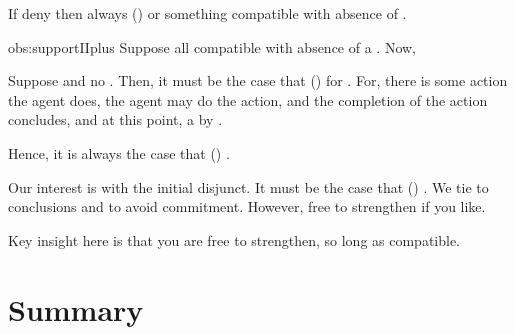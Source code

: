 \begin{note}
  \begin{observation}%
    \label{obs:supportIIplus}%
    If deny \supportII{} then always (\pwP{}) \wit{} or something compatible with absence of \wit{}.
  \end{observation}

  \begin{argument}{obs:supportIIplus}
    Suppose all compatible with absence of a \wit{}.
    Now,

    Suppose \fc{} and no \ros{}.
    Then, it must be the case that (\pwP{}) \wit{} for \ros{}.
    For, there is some action the agent does, the agent may do the action, and the completion of the action concludes, and at this point, a \ros{} by \supportII{}.

    Hence, it is always the case that (\pwP{}) \wit{}.
  \end{argument}

  Our interest is with the initial disjunct.
  It must be the case that (\pwP{}) \wit{}.
  We tie  to conclusions and to avoid commitment.
  However, free to strengthen if you like.

  Key insight here is that you are free to strengthen, so long as compatible.
\end{note}

\section*{Summary}

